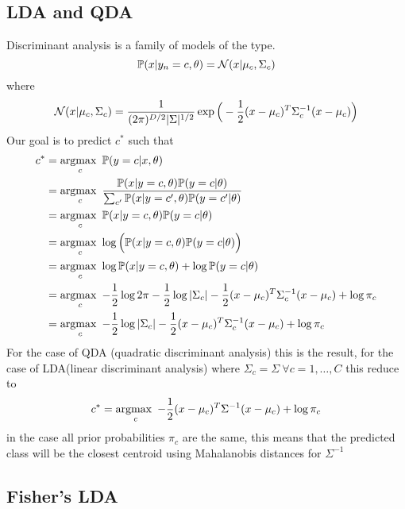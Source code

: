 \documentclass[../../main.tex]{subfiles}
\begin{document}
\subsection{LDA and QDA}
Discriminant analysis is a family of models of the type.
\begin{equation*}
    \mathbb{P}(x | y_n=c, \theta) = \mathcal{N}(x|\mu_c, \Sigma_c)
\end{equation*}
where
\begin{equation*}
    \mathcal{N}(x|\mu_c, \Sigma_c) = \dfrac{1}{(2\pi)^{D/2} |\Sigma|^{1/2}} \exp\Big(-\frac{1}{2} (x-\mu_c)^T \Sigma_c^{-1} (x-\mu_c)\Big)
\end{equation*}
Our goal is to predict $c^*$ such that
\begin{align*}
    c^*
    &= \operatorname*{argmax\text{ }}_c \mathbb{P}(y=c|x,\theta)\\
    &= \operatorname*{argmax\text{ }}_c \dfrac{\mathbb{P}(x|y=c,\theta)\mathbb{P}(y=c|\theta)}{\sum_{c'}\mathbb{P}(x|y=c',\theta)\mathbb{P}(y=c'|\theta)}\\
    &= \operatorname*{argmax\text{ }}_c \mathbb{P}(x|y=c,\theta)\mathbb{P}(y=c|\theta)\\
    &= \operatorname*{argmax\text{ }}_c \log\Big(\mathbb{P}(x|y=c,\theta)\mathbb{P}(y=c|\theta)\Big)\\
    &= \operatorname*{argmax\text{ }}_c \log\mathbb{P}(x|y=c,\theta) + \log\mathbb{P}(y=c|\theta)\\
    &= \operatorname*{argmax\text{ }}_c -\frac{1}{2}\log2\pi -\frac{1}{2}\log|\Sigma_c| -\frac{1}{2} (x-\mu_c)^T \Sigma_c^{-1} (x-\mu_c) + \log\pi_c\\
    &= \operatorname*{argmax\text{ }}_c -\frac{1}{2}\log|\Sigma_c| -\frac{1}{2} (x-\mu_c)^T \Sigma_c^{-1} (x-\mu_c) + \log\pi_c\\
\end{align*}
For the case of QDA (quadratic discriminant analysis) this is the result, for the case of LDA(linear discriminant analysis) where $\Sigma_c = \Sigma\ \forall c=1,\dots,C$ this reduce to
\begin{align*}
    c^*
    &= \operatorname*{argmax\text{ }}_c -\frac{1}{2} (x-\mu_c)^T \Sigma^{-1} (x-\mu_c) + \log\pi_c\\
\end{align*}
in the case all prior probabilities $\pi_c$ are the same, this means that the predicted class will be the closest centroid using Mahalanobis distances for $\Sigma^{-1}$

\subsection{Fisher's LDA}
\end{document}

